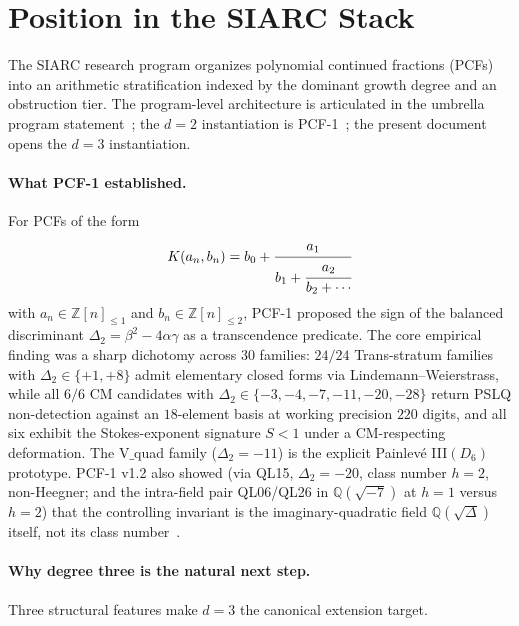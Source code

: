 \documentclass[11pt,a4paper]{article}
\theoremstyle{definition}
\theoremstyle{remark}
\newcommand{\Q}{\mathbb{Q}}
\newcommand{\Z}{\mathbb{Z}}
\begin{document}
\section{Position in the SIARC Stack}\label{sec:position}

The SIARC research program organizes polynomial continued fractions (PCFs)
into an arithmetic stratification indexed by the dominant growth degree
and an obstruction tier. The program-level architecture is articulated in
the umbrella program statement~\cite{Papanokechi2026UMB}; the
$d=2$ instantiation is PCF-1~\cite{Papanokechi2026PCF1}; the present
document opens the $d=3$ instantiation.

\paragraph{What PCF-1 established.}
For PCFs of the form
\[
K(a_{n},b_{n})=b_{0}+\cfrac{a_{1}}{b_{1}+\cfrac{a_{2}}{b_{2}+\cdots}}
\]
with $a_{n}\in\Z[n]_{\le 1}$ and $b_{n}\in\Z[n]_{\le 2}$, PCF-1
proposed the sign of the balanced discriminant
$\Delta_{2}=\beta^{2}-4\alpha\gamma$ as a transcendence predicate. The
core empirical finding was a sharp dichotomy across $30$ families: $24/24$
Trans-stratum families with $\Delta_{2}\in\{+1,+8\}$ admit elementary
closed forms via Lindemann--Weierstrass, while all $6/6$ CM candidates
with $\Delta_{2}\in\{-3,-4,-7,-11,-20,-28\}$ return PSLQ non-detection
against an $18$-element basis at working precision $220$ digits, and all
six exhibit the Stokes-exponent signature $S<1$ under a CM-respecting
deformation. The V$\_$quad family ($\Delta_{2}=-11$) is the explicit
Painlev\'e III$(D_{6})$ prototype. PCF-1 v1.2 also showed (via QL15,
$\Delta_{2}=-20$, class number $h=2$, non-Heegner; and the intra-field
pair QL06/QL26 in $\Q(\sqrt{-7})$ at $h=1$ versus $h=2$) that the
controlling invariant is the imaginary-quadratic field $\Q(\sqrt{\Delta})$
itself, not its class number~\cite{Papanokechi2026PCF1}.

\paragraph{Why degree three is the natural next step.}
Three structural features make $d=3$ the canonical extension target.
\end{document}

